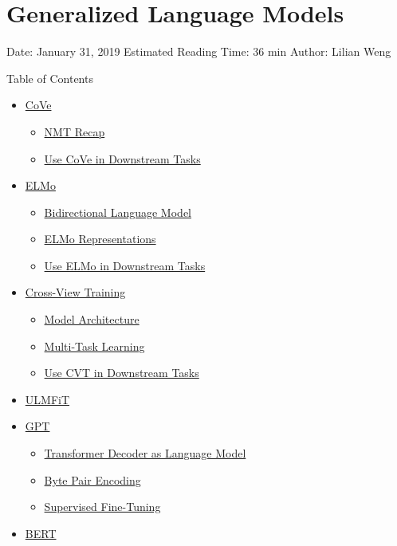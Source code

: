 \section{Generalized Language Models}\label{generalized-language-models}

Date: January 31, 2019 \textbar{} Estimated Reading Time: 36 min \textbar{} Author: Lilian Weng

{Table of Contents}

\begin{itemize}
\tightlist
\item
  \hyperref[cove]{CoVe}

  \begin{itemize}
  \tightlist
  \item
    \hyperref[nmt-recap]{NMT Recap}
  \item
    \hyperref[use-cove-in-downstream-tasks]{Use CoVe in Downstream Tasks}
  \end{itemize}
\item
  \hyperref[elmo]{ELMo}

  \begin{itemize}
  \tightlist
  \item
    \hyperref[bidirectional-language-model]{Bidirectional Language Model}
  \item
    \hyperref[elmo-representations]{ELMo Representations}
  \item
    \hyperref[use-elmo-in-downstream-tasks]{Use ELMo in Downstream Tasks}
  \end{itemize}
\item
  \hyperref[cross-view-training]{Cross-View Training}

  \begin{itemize}
  \tightlist
  \item
    \hyperref[model-architecture]{Model Architecture}
  \item
    \hyperref[multi-task-learning]{Multi-Task Learning}
  \item
    \hyperref[use-cvt-in-downstream-tasks]{Use CVT in Downstream Tasks}
  \end{itemize}
\item
  \hyperref[ulmfit]{ULMFiT}
\item
  \hyperref[gpt]{GPT}

  \begin{itemize}
  \tightlist
  \item
    \hyperref[transformer-decoder-as-language-model]{Transformer Decoder as Language Model}
  \item
    \hyperref[byte-pair-encoding]{Byte Pair Encoding}
  \item
    \hyperref[supervised-fine-tuning]{Supervised Fine-Tuning}
  \end{itemize}
\item
  \hyperref[bert]{BERT}


\end{itemize}
